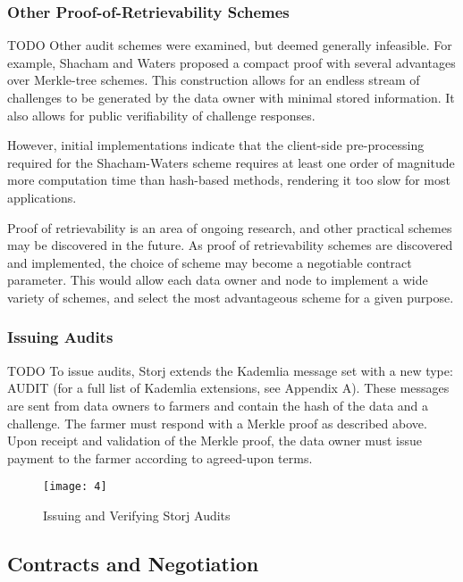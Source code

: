 \documentclass[a4paper,10pt]{article}
\newcommand{\todo}[1]{{\color{red} TODO #1}}
\begin{document}
\subsubsection{Other Proof-of-Retrievability Schemes}

\todo{
Other audit schemes were examined, but deemed generally infeasible. For example,
Shacham and Waters proposed a compact proof \cite{6} with several advantages
over Merkle-tree schemes. This construction allows for an endless stream of
challenges to be generated by the data owner with minimal stored information. It
also allows for public verifiability of challenge responses.

However, initial implementations indicate that the client-side pre-processing
required for the Shacham-Waters scheme requires at least one order of magnitude
more computation time than hash-based methods, rendering it too slow for most
applications.

Proof of retrievability is an area of ongoing research, and other practical
schemes may be discovered in the future. As proof of retrievability schemes are
discovered and implemented, the choice of scheme may become a negotiable
contract parameter. This would allow each data owner and node to implement a
wide variety of schemes, and select the most advantageous scheme for a given
purpose.
}

\subsubsection{Issuing Audits}

\todo{
To issue audits, Storj extends the Kademlia message set with a new type: AUDIT
(for a full list of Kademlia extensions, see Appendix A). These messages are
sent from data owners to farmers and contain the hash of the data and a
challenge. The farmer must respond with a Merkle proof as described above. Upon
receipt and validation of the Merkle proof, the data owner must issue payment to
the farmer according to agreed-upon terms.

\begin{figure}[hbt]
\centering
\texttt{[image: 4]}
\caption{Issuing and Verifying Storj Audits}
\end{figure}
}

\subsection{Contracts and Negotiation}
\end{document}
